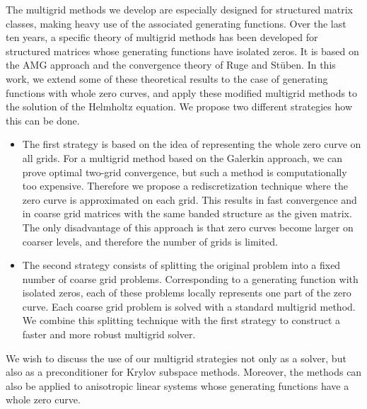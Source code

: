 \documentclass{report}
\begin{document}
The multigrid methods we develop are especially designed for structured
matrix classes, making heavy use of the associated generating functions.
Over the last ten years, a specific theory of multigrid methods has been
developed for structured matrices whose generating functions have
isolated zeros. It is based on the AMG approach and the convergence
theory of Ruge and St\"uben.
In this work, we extend some of these theoretical results to the case of
generating functions with whole zero curves, and apply these modified
multigrid methods to the solution of the Helmholtz equation. We propose
two different strategies how this can be done.
\begin{itemize}
\item The first strategy is based on the idea of representing the whole
zero curve on all grids. For a multigrid method based on the Galerkin
approach, we can prove optimal two-grid convergence, but such a method is
computationally too expensive. Therefore we propose a rediscretization
technique where the zero curve is approximated on each grid. This results
in fast convergence and in coarse grid matrices with the same banded
structure as the given matrix. The only disadvantage of this approach is
that zero curves become larger on coarser levels, and therefore the
number of grids is limited.
\item The second strategy consists of splitting the original problem into
a fixed number of coarse grid problems. Corresponding to a generating
function with isolated zeros, each of these problems locally represents
one part of the zero curve. Each coarse grid problem is solved with a
standard multigrid method. We combine this splitting technique with the
first strategy to construct a faster and more robust multigrid solver.
\end{itemize}
We wish to discuss the use of our multigrid strategies not only as a
solver, but also as a preconditioner for Krylov subspace methods.
Moreover, the methods can also be applied to anisotropic linear systems
whose generating functions have a whole zero curve.
\end{document}

